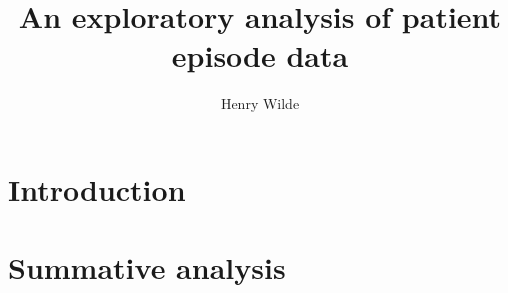 \documentclass{article}
\title{An exploratory analysis of patient episode data}
\author{Henry Wilde}
\begin{document}
\maketitle

\section{Introduction}\label{sec:intro}


\section{Summative analysis}\label{sec:summative}




\end{document}
